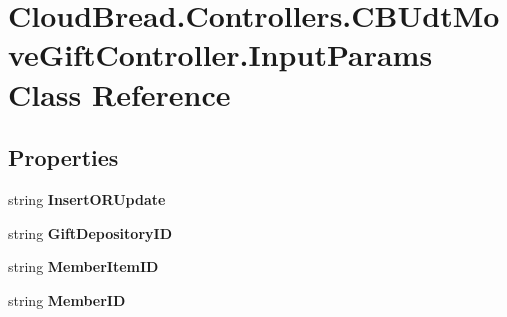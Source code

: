 \hypertarget{class_cloud_bread_1_1_controllers_1_1_c_b_udt_move_gift_controller_1_1_input_params}{}\section{Cloud\+Bread.\+Controllers.\+C\+B\+Udt\+Move\+Gift\+Controller.\+Input\+Params Class Reference}
\label{class_cloud_bread_1_1_controllers_1_1_c_b_udt_move_gift_controller_1_1_input_params}
\subsection*{Properties}
\begin{DoxyCompactItemize}
\item 
string {\bfseries Insert\+O\+R\+Update}\hypertarget{class_cloud_bread_1_1_controllers_1_1_c_b_udt_move_gift_controller_1_1_input_params_abe0c5c0e20767f3dc38f3eb3f8c4596c}{}\label{class_cloud_bread_1_1_controllers_1_1_c_b_udt_move_gift_controller_1_1_input_params_abe0c5c0e20767f3dc38f3eb3f8c4596c}

\item 
string {\bfseries Gift\+Depository\+ID}\hypertarget{class_cloud_bread_1_1_controllers_1_1_c_b_udt_move_gift_controller_1_1_input_params_a635cc6b98c98165cf5324c1a7c8e8632}{}\label{class_cloud_bread_1_1_controllers_1_1_c_b_udt_move_gift_controller_1_1_input_params_a635cc6b98c98165cf5324c1a7c8e8632}

\item 
string {\bfseries Member\+Item\+ID}\hypertarget{class_cloud_bread_1_1_controllers_1_1_c_b_udt_move_gift_controller_1_1_input_params_a97f5a57164b73793ee27d412fd18372a}{}\label{class_cloud_bread_1_1_controllers_1_1_c_b_udt_move_gift_controller_1_1_input_params_a97f5a57164b73793ee27d412fd18372a}

\item 
string {\bfseries Member\+ID}\hypertarget{class_cloud_bread_1_1_controllers_1_1_c_b_udt_move_gift_controller_1_1_input_params_ad8117adb285fb9d0442dc9f78133deef}{}\label{class_cloud_bread_1_1_controllers_1_1_c_b_udt_move_gift_controller_1_1_input_params_ad8117adb285fb9d0442dc9f78133deef}


\end{DoxyCompactItemize}

